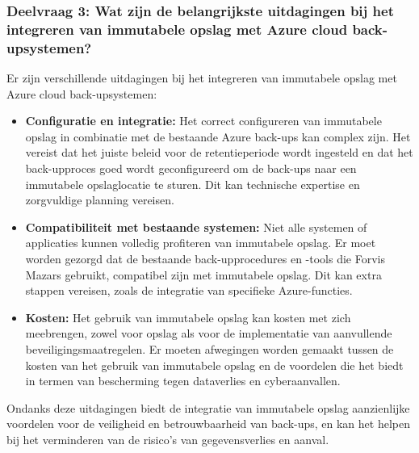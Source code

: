 \subsubsection{Deelvraag 3: Wat zijn de belangrijkste uitdagingen bij het integreren van immutabele opslag met Azure cloud back-upsystemen?}

Er zijn verschillende uitdagingen bij het integreren van immutabele opslag met Azure cloud back-upsystemen:

\begin{itemize}
    \item \textbf{Configuratie en integratie:} Het correct configureren van immutabele opslag in combinatie met de bestaande Azure back-ups kan complex zijn. Het vereist dat het juiste beleid voor de retentieperiode wordt ingesteld en dat het back-upproces goed wordt geconfigureerd om de back-ups naar een immutabele opslaglocatie te sturen. Dit kan technische expertise en zorgvuldige planning vereisen.
    \item \textbf{Compatibiliteit met bestaande systemen:} Niet alle systemen of applicaties kunnen volledig profiteren van immutabele opslag. Er moet worden gezorgd dat de bestaande back-upprocedures en -tools die Forvis Mazars gebruikt, compatibel zijn met immutabele opslag. Dit kan extra stappen vereisen, zoals de integratie van specifieke Azure-functies.
    \item \textbf{Kosten:} Het gebruik van immutabele opslag kan kosten met zich meebrengen, zowel voor opslag als voor de implementatie van aanvullende beveiligingsmaatregelen. Er moeten afwegingen worden gemaakt tussen de kosten van het gebruik van immutabele opslag en de voordelen die het biedt in termen van bescherming tegen dataverlies en cyberaanvallen.
\end{itemize}

Ondanks deze uitdagingen biedt de integratie van immutabele opslag aanzienlijke voordelen voor de veiligheid en betrouwbaarheid van back-ups, en kan het helpen bij het verminderen van de risico's van gegevensverlies en aanval.
